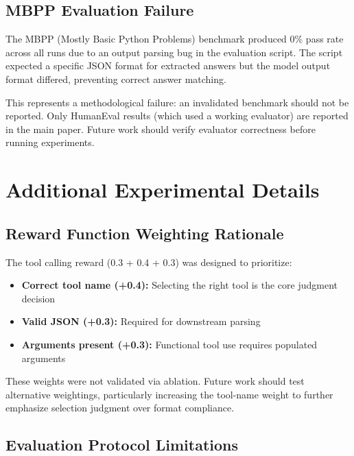 \documentclass{article}
\begin{document}
\subsection{MBPP Evaluation Failure}

The MBPP (Mostly Basic Python Problems) benchmark produced 0\% pass rate across all runs due to an output parsing bug in the evaluation script. The script expected a specific JSON format for extracted answers but the model output format differed, preventing correct answer matching.

This represents a methodological failure: an invalidated benchmark should not be reported. Only HumanEval results (which used a working evaluator) are reported in the main paper. Future work should verify evaluator correctness before running experiments.

\section{Additional Experimental Details}

\subsection{Reward Function Weighting Rationale}

The tool calling reward (0.3 + 0.4 + 0.3) was designed to prioritize:
\begin{itemize}
    \item \textbf{Correct tool name (+0.4):} Selecting the right tool is the core judgment decision
    \item \textbf{Valid JSON (+0.3):} Required for downstream parsing
    \item \textbf{Arguments present (+0.3):} Functional tool use requires populated arguments
\end{itemize}

These weights were not validated via ablation. Future work should test alternative weightings, particularly increasing the tool-name weight to further emphasize selection judgment over format compliance.

\subsection{Evaluation Protocol Limitations}
\end{document}
